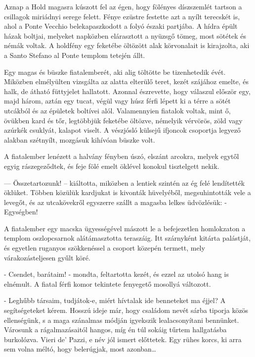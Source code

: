 \documentclass{thesis-ekf}
\theoremstyle{definition}
\theoremstyle{remark}
\begin{document}
Aznap  a  Hold  magasra  kúszott  fel  az  égen,  hogy  fölényes 
díszszemlét tartson a csillagok miriádnyi serege felett. Fénye ezüstre 
festette  azt  a  nyílt  terecskét  is,  ahol  a  Ponte  Vecchio 
belekapaszkodott a folyó északi partjába. A hídra épült házak boltjai, 
melyeket napközben elárasztott a nyüzsgő tömeg, most sötétek és 
némák voltak. A holdfény egy feketébe öltözött alak körvonalait is 
kirajzolta, aki a Santo Stefano al Ponte templom tetején állt. 

Egy magas és büszke fiatalemberét, aki alig töltötte be tizenhetedik évét. 
Miközben  elmélyülten  vizsgálta  az  alatta  elterülő  teret,  kezét 
szájához  emelte,  és  halk,  de  átható  füttyjelet  hallatott.  Azonnal 
észrevette, hogy válaszul először egy, majd három, aztán egy tucat, 
végül vagy húsz férfi lépett ki a térre a sötét utcákból és az épületek 
boltívei alól. Valamennyien fiatalok voltak, mint ő, övükben kard és 
tőr,  legtöbbjük  feketébe  öltözve,  némelyik  vérvörös,  zöld  vagy 
azúrkék  csuklyát,  kalapot  viselt.  A  vészjósló  külsejű  ifjoncok 
csoportja legyező alakban szétnyílt, mozgásuk kihívóan büszke volt. 

A  fiatalember  lenézett a halvány  fényben úszó, elszánt arcokra, 
melyek  egytől  egyig  rászegeződtek,  és  feje  fölé  emelt  öklével 
konokul tisztelgett nekik. 

— Összetartozunk! -- kiáltotta, miközben a  lentiek  szintén az ég 
felé  lendítették  öklüket.  Többen  közülük  kardjukat  is  kivonták 
hüvelyéből,  megsuhintották  vele  a  levegőt,  és  az  utcakövekről 
egyszerre szállt a magasba lelkes üdvözlésük: - Egységben! 

A fiatalember egy macska ügyességével mászott le a befejezetlen 
homlokzaton a templom oszlopcsarnok alátámasztotta teraszáig. Itt 
szárnyként  kitárta  palástját,  és  egyetlen  ruganyos  szökkenéssel  a 
csoport közepén termett, mely várakozásteljesen gyűlt köré. 

- Csendet, barátaim! - mondta, feltartotta kezét, és ezzel az utolsó 
hang is elnémult. A fiatal férfi komor tekintete fenyegető mosollyá 
változott. 

- Leghűbb társaim, tudjátok-e, miért hívtalak ide benneteket ma 
éjjel?  A  segítségeteket  kérem.  Hosszú  ideje  már,  hogy  családom 
nevét sárba tiporja közös ellenségünk, s a maga szánalmas módján 
igyekszik  lealacsonyítani  bennünket.  Városunk  a  rágalmazásaitól 
hangos, míg én túl sokáig tűrtem hallgatásba burkolózva. Vieri de' 
Pazzi, e név jól ismert előttetek. Egy rühes korcs, ki arra sem volna 
méltó, hogy belerúgjak, most azonban\dots
\end{document}
